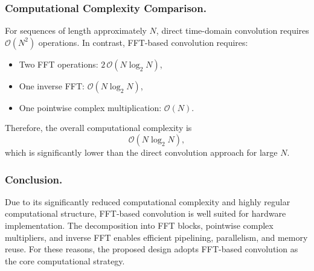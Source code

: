 \subsubsection{Computational Complexity Comparison.}
For sequences of length approximately $N$, direct time-domain convolution requires
$\mathcal{O}(N^2)$ operations.
In contrast, FFT-based convolution requires:
\begin{itemize}
    \item Two FFT operations: $2\,\mathcal{O}(N\log_2 N)$,
    \item One inverse FFT: $\mathcal{O}(N\log_2 N)$,
    \item One pointwise complex multiplication: $\mathcal{O}(N)$.
\end{itemize}
Therefore, the overall computational complexity is
\begin{equation}
\mathcal{O}(N\log_2 N),
\end{equation}
which is significantly lower than the direct convolution approach for large $N$.

\subsubsection{Conclusion.}
Due to its significantly reduced computational complexity and highly regular
computational structure, FFT-based convolution is well suited for hardware
implementation.
The decomposition into FFT blocks, pointwise complex multipliers, and inverse FFT
enables efficient pipelining, parallelism, and memory reuse.
For these reasons, the proposed design adopts FFT-based convolution as the core
computational strategy.

